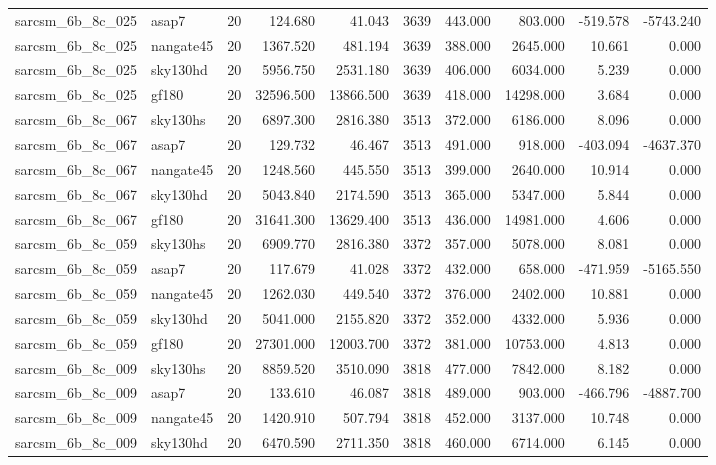 \begin{tabular}{llrrrrrrrr}
sarcsm\_6b\_8c\_025 & asap7 & 20 & 124.680 & 41.043 & 3639 & 443.000 & 803.000 & -519.578 & -5743.240 \\
sarcsm\_6b\_8c\_025 & nangate45 & 20 & 1367.520 & 481.194 & 3639 & 388.000 & 2645.000 & 10.661 & 0.000 \\
sarcsm\_6b\_8c\_025 & sky130hd & 20 & 5956.750 & 2531.180 & 3639 & 406.000 & 6034.000 & 5.239 & 0.000 \\
sarcsm\_6b\_8c\_025 & gf180 & 20 & 32596.500 & 13866.500 & 3639 & 418.000 & 14298.000 & 3.684 & 0.000 \\
sarcsm\_6b\_8c\_067 & sky130hs & 20 & 6897.300 & 2816.380 & 3513 & 372.000 & 6186.000 & 8.096 & 0.000 \\
sarcsm\_6b\_8c\_067 & asap7 & 20 & 129.732 & 46.467 & 3513 & 491.000 & 918.000 & -403.094 & -4637.370 \\
sarcsm\_6b\_8c\_067 & nangate45 & 20 & 1248.560 & 445.550 & 3513 & 399.000 & 2640.000 & 10.914 & 0.000 \\
sarcsm\_6b\_8c\_067 & sky130hd & 20 & 5043.840 & 2174.590 & 3513 & 365.000 & 5347.000 & 5.844 & 0.000 \\
sarcsm\_6b\_8c\_067 & gf180 & 20 & 31641.300 & 13629.400 & 3513 & 436.000 & 14981.000 & 4.606 & 0.000 \\
sarcsm\_6b\_8c\_059 & sky130hs & 20 & 6909.770 & 2816.380 & 3372 & 357.000 & 5078.000 & 8.081 & 0.000 \\
sarcsm\_6b\_8c\_059 & asap7 & 20 & 117.679 & 41.028 & 3372 & 432.000 & 658.000 & -471.959 & -5165.550 \\
sarcsm\_6b\_8c\_059 & nangate45 & 20 & 1262.030 & 449.540 & 3372 & 376.000 & 2402.000 & 10.881 & 0.000 \\
sarcsm\_6b\_8c\_059 & sky130hd & 20 & 5041.000 & 2155.820 & 3372 & 352.000 & 4332.000 & 5.936 & 0.000 \\
sarcsm\_6b\_8c\_059 & gf180 & 20 & 27301.000 & 12003.700 & 3372 & 381.000 & 10753.000 & 4.813 & 0.000 \\
sarcsm\_6b\_8c\_009 & sky130hs & 20 & 8859.520 & 3510.090 & 3818 & 477.000 & 7842.000 & 8.182 & 0.000 \\
sarcsm\_6b\_8c\_009 & asap7 & 20 & 133.610 & 46.087 & 3818 & 489.000 & 903.000 & -466.796 & -4887.700 \\
sarcsm\_6b\_8c\_009 & nangate45 & 20 & 1420.910 & 507.794 & 3818 & 452.000 & 3137.000 & 10.748 & 0.000 \\
sarcsm\_6b\_8c\_009 & sky130hd & 20 & 6470.590 & 2711.350 & 3818 & 460.000 & 6714.000 & 6.145 & 0.000 \\

\end{tabular}
